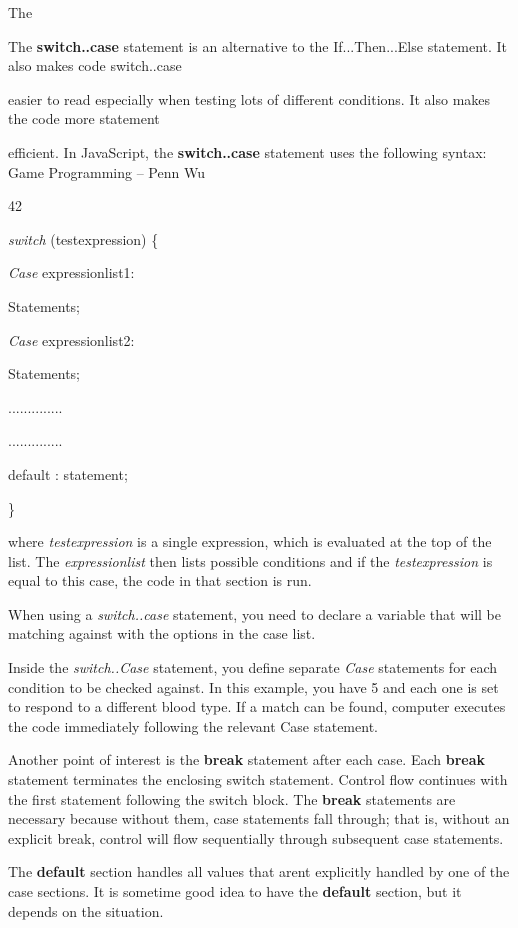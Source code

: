 \documentclass[
]{article}
\begin{document}
The

The \textbf{switch..case} statement is an alternative to the
If...Then...Else statement. It also makes code switch..case

easier to read especially when testing lots of different conditions. It
also makes the code more statement

efficient. In JavaScript, the \textbf{switch..case} statement uses the
following syntax: Game Programming -- Penn Wu

42

\protect\hypertarget{index_split_004.htmlux5cux23p43}{}{} \emph{switch}
(testexpression) \{

\emph{Case} expressionlist1:

Statements;

\emph{Case} expressionlist2:

Statements;

..............

..............

default : statement;

\}

where \emph{testexpression} is a single expression, which is evaluated
at the top of the list. The \emph{expressionlist} then lists possible
conditions and if the \emph{testexpression} is equal to this case, the
code in that section is run.

When using a \emph{switch..case} statement, you need to declare a
variable that will be matching against with the options in the case
list.

Inside the \emph{switch..Case} statement, you define separate
\emph{Case} statements for each condition to be checked against. In this
example, you have 5 and each one is set to respond to a different blood
type. If a match can be found, computer executes the code immediately
following the relevant Case statement.

Another point of interest is the \textbf{break} statement after each
case. Each \textbf{break} statement terminates the enclosing switch
statement. Control flow continues with the first statement following the
switch block. The \textbf{break} statements are necessary because
without them, case statements fall through; that is, without an explicit
break, control will flow sequentially through subsequent case
statements.

The \textbf{default} section handles all values that
aren\textquotesingle t explicitly handled by one of the case sections.
It is sometime good idea to have the \textbf{default} section, but it
depends on the situation.
\end{document}
